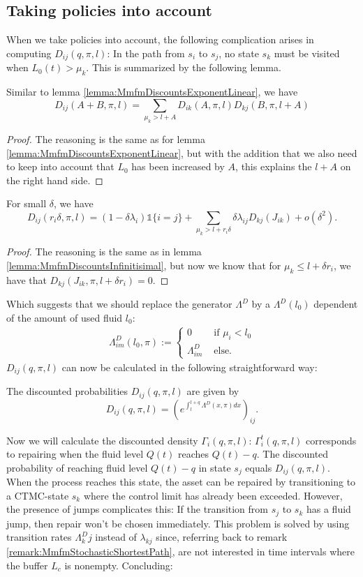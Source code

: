 \subsection{Taking policies into account}
When we take policies into account, the following complication arises in computing $D_{ij}(q, \pi,l)$:
In the path from $s_i$ to $s_j$, no state $s_k$ must be visited when $L_0(t)>\mu_k$.
This is summarized by the following lemma.
\begin{lemma}
	Similar to lemma \ref{lemma:MmfmDiscountsExponentLinear}, we have
	\[
	D_{ij}(A+B,\pi,l)=\sum\limits_{\mu_k>l+A} D_{ik}(A,\pi,l)D_{kj}(B,\pi,l+A)
	\]
	\begin{proof}
		The reasoning is the same as for lemma \ref{lemma:MmfmDiscountsExponentLinear}, but with the addition that we also need to keep into account that $L_0$ has been increased by $A$, this explains the $l+A$ on the right hand side.
	\end{proof}
\end{lemma}

\begin{lemma}
	For small $\delta$, we have
	\[
	D_{ij}(r_i\delta,\pi,l)=(1-\delta\lambda_i)\mathds{1}\{i=j\}+\sum\limits_{\mu_k>l+r_i\delta}\delta\lambda_{ij}D_{kj}(J_{ik})+o(\delta^2).
	\]
	\begin{proof}
		The reasoning is the same as in lemma \ref{lemma:MmfmDiscountsInfinitisimal}, but now we know that for $\mu_k\leq l+\delta r_i$, we have that $D_{kj}(J_{ik},\pi,l+\delta r_i)=0$.
	\end{proof}
\end{lemma}
Which suggests that we should replace the generator $\Lambda^D$ by a $\Lambda^D(l_0)$ dependent of the amount of used fluid $l_0$:
\begin{equation}
\begin{split}
\Lambda^D_{im}(l_0,\pi):=\begin{cases}
0&\text{ if }\mu_i<l_0\\
\Lambda^D_{im}&\text{ else.}
\end{cases}
\end{split}
\end{equation}
$D_{ij}(q, \pi,l)$ can now be calculated in the following straightforward way:
\begin{theorem}
	The discounted probabilities $D_{ij}(q, \pi,l)$ are given by
	\[
	D_{ij}(q, \pi,l)=\left(e^{\int_l^{l+q}\Lambda^D(x,\pi)dx}\right)_{ij}.
	\]
\end{theorem}
Now we will calculate the discounted density $\Gamma_i(q,\pi,l)$:
$\Gamma_i^t(q,\pi,l)$ corresponds to repairing when the fluid level $Q(t)$ reaches $Q(t)-q$.
The discounted probability of reaching fluid level $Q(t)-q$ in state $s_j$ equals $D_{ij}(q, \pi,l)$.
When the process reaches this state, the asset can be repaired by transitioning to a CTMC-state $s_k$ where the control limit has already been exceeded.
However, the presence of jumps complicates this:
If the transition from $s_j$ to $s_k$ has a fluid jump, then repair won't be chosen immediately.
This problem is solved by using transition rates $\Lambda^D_kj$ instead of $\lambda_{kj}$ since, referring back to remark \ref{remark:MmfmStochasticShortestPath}, are not interested in time intervals where the buffer $L_c$ is nonempty.
Concluding:

